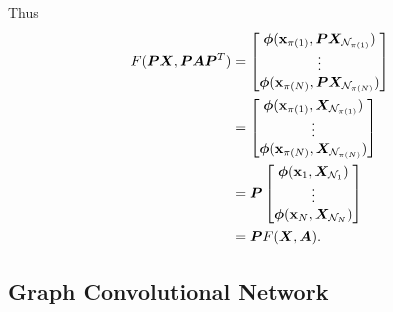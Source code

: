 Thus 
\begin{align*}
    F({\bm{P}}{\bm{X}}, {\bm{P}}{\bm{A}}{\bm{P}}^T) &= \begin{bmatrix}\bm{\phi}({\textbf{x}}_{\pi(1)}, {\bm{P}}{\bm{X}}_{{\mathcal{N}}_{\pi(1)}}) \\ \vdots \\ \bm{\phi}({\textbf{x}}_{\pi(N)}, {\bm{P}}{\bm{X}}_{{\mathcal{N}}_{\pi(N)}})\end{bmatrix} \\ 
        &= \begin{bmatrix}\bm{\phi}({\textbf{x}}_{\pi(1)}, {\bm{X}}_{{\mathcal{N}}_{\pi(1)}}) \\ \vdots \\ \bm{\phi}({\textbf{x}}_{\pi(N)}, {\bm{X}}_{{\mathcal{N}}_{\pi(N)}})\end{bmatrix} \\
        &= {\bm{P}}\begin{bmatrix}\bm{\phi}({\textbf{x}}_1, {\bm{X}}_{{\mathcal{N}}_1}) \\ \vdots \\ \bm{\phi}({\textbf{x}}_N, {\bm{X}}_{{\mathcal{N}}_N})\end{bmatrix} \\
        &= {\bm{P}} F({\bm{X}}, {\bm{A}}).
\end{align*}









\subsection{Graph Convolutional Network}

